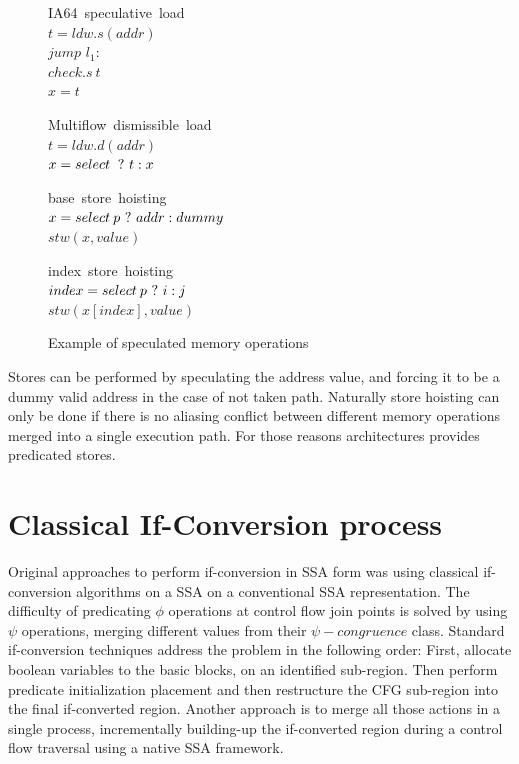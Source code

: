 \begin{figure}
\begin{minipage}[t]{4cm}
\mbox{IA64 speculative load} \\
$t = ldw.s(addr) $ \\
$jump$ $l_1:$ \\
$check.s\:t$ \\
$x = t$ \\
\end{minipage}
\begin{minipage}[t]{4cm}
\mbox{Multiflow dismissible load} \\
$t = ldw.d(addr) $ \\
$x = select\: ~?~ t : x $ \\
\end{minipage}

\begin{minipage}[t]{4cm}
\mbox{base store hoisting} \\
$x=select\:p ~?~ addr : dummy $ \\
$stw (x, value) $ \\
\end{minipage}
\begin{minipage}[t]{4cm}
\mbox{index store hoisting} \\
$index=select\:p ~?~ i : j $ \\
$stw (x[index], value) $ \\
\end{minipage}
\label{fig:spec}
\caption{Example of speculated memory operations}
\end{figure}

Stores can be performed by speculating the address value, and forcing it to be a dummy valid address in the case of not taken path. Naturally store hoisting can only be done if there is no aliasing conflict between different memory operations merged into a single execution path. For those reasons architectures provides predicated stores.

\section{Classical If-Conversion process}

Original approaches to perform if-conversion in SSA form was using classical if-conversion algorithms on a SSA on a conventional SSA representation. The difficulty of predicating $\phi$ operations at control flow join points is solved by using $\psi$ operations, merging different values from their $\psi-congruence$ class. 
Standard if-conversion techniques address the problem in the following order: First, allocate boolean variables to the basic blocks, on an identified sub-region. Then perform predicate initialization placement and then restructure the CFG sub-region into the final if-converted region. 
 Another approach is to merge all those actions in a single process, incrementally building-up the if-converted region during a control flow traversal using a native SSA framework.

